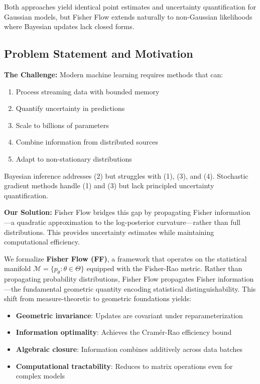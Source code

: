 \documentclass[11pt]{article}
\begin{document}
Both approaches yield identical point estimates and uncertainty quantification for Gaussian models, but Fisher Flow extends naturally to non-Gaussian likelihoods where Bayesian updates lack closed forms.

\subsection{Problem Statement and Motivation}

\textbf{The Challenge:} Modern machine learning requires methods that can:
\begin{enumerate}
\item Process streaming data with bounded memory
\item Quantify uncertainty in predictions
\item Scale to billions of parameters
\item Combine information from distributed sources
\item Adapt to non-stationary distributions
\end{enumerate}

Bayesian inference addresses (2) but struggles with (1), (3), and (4). Stochastic gradient methods handle (1) and (3) but lack principled uncertainty quantification.

\textbf{Our Solution:} Fisher Flow bridges this gap by propagating Fisher information—a quadratic approximation to the log-posterior curvature—rather than full distributions. This provides uncertainty estimates while maintaining computational efficiency.

We formalize \textbf{Fisher Flow (FF)}, a framework that operates on the statistical manifold $\mathcal{M} = \{p_\theta : \theta \in \Theta\}$ equipped with the Fisher-Rao metric. Rather than propagating probability distributions, Fisher Flow propagates Fisher information—the fundamental geometric quantity encoding statistical distinguishability. This shift from measure-theoretic to geometric foundations yields:

\begin{itemize}
\item \textbf{Geometric invariance}: Updates are covariant under reparameterization
\item \textbf{Information optimality}: Achieves the Cramér-Rao efficiency bound
\item \textbf{Algebraic closure}: Information combines additively across data batches
\item \textbf{Computational tractability}: Reduces to matrix operations even for complex models
\end{itemize}
\end{document}
